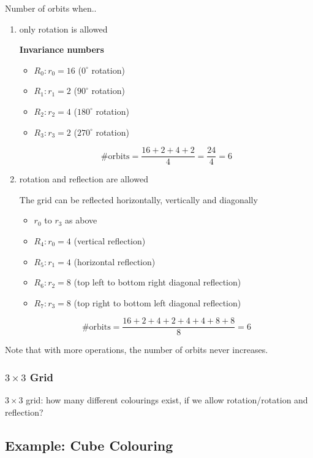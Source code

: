 \documentclass[11pt]{article}
\begin{document}
Number of orbits when..
\begin{enumerate}
\item only rotation is allowed
	
\textbf{Invariance numbers}
    \begin{itemize}
    \item $ R_0: r_0 = 16 $ ($ 0^\circ $ rotation)
    \item $ R_1: r_1 = 2 $ ($ 90^\circ $ rotation)
    \item $ R_2: r_2 = 4 $ ($ 180^\circ $ rotation)
    \item $ R_3: r_3 = 2 $ ($ 270^\circ $ rotation)
    \end{itemize}

	\[ \#\text{orbits} = \frac{16 + 2 + 4 + 2}{4} = \frac{24}{4} = 6 \]
\item rotation and reflection are allowed \newline

	The grid can be reflected horizontally, vertically and diagonally
    \begin{itemize}
    \item $ r_0 $ to $ r_3 $ as above
    \item $ R_4: r_0 = 4 $ (vertical reflection)
    \item $ R_5: r_1 = 4 $ (horizontal reflection)
    \item $ R_6: r_2 = 8 $ (top left to bottom right diagonal reflection)
    \item $ R_7: r_3 = 8 $ (top right to bottom left diagonal reflection)
    \end{itemize}

	\[ \#\text{orbits} = \frac{16 + 2 + 4 + 2 + 4 + 4 + 8 + 8}{8} = 6 \]
\end{enumerate}

Note that with more operations, the number of orbits never increases.

\subsubsection{$ 3 \times 3 $ Grid}

$ 3 \times 3 $ grid: how many different colourings exist, if we allow rotation/rotation and reflection?


\subsection{Example: Cube Colouring}
\end{document}
